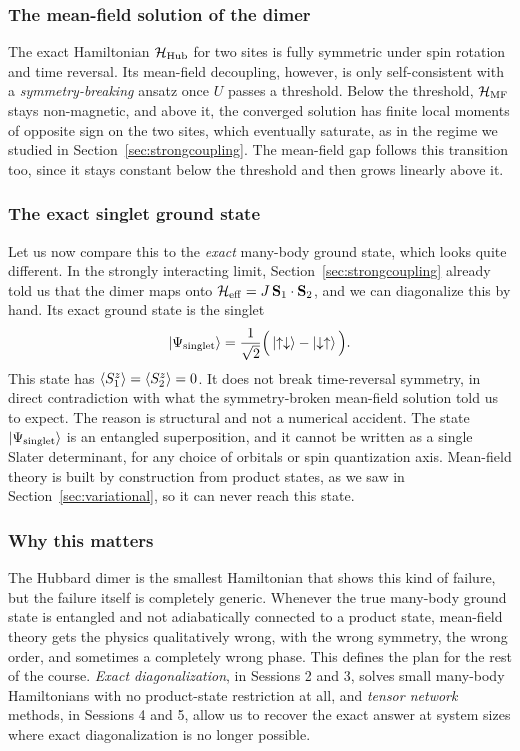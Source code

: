 \documentclass[lecture_notes.tex]{subfiles}
\begin{document}
\subsubsection{The mean-field solution of the dimer}
The exact Hamiltonian $\mathcal{H}_{\mathrm{Hub}}$ for two sites is fully symmetric under spin rotation
and time reversal. Its mean-field decoupling, however, is only self-consistent with a
\emph{symmetry-breaking} ansatz once $U$ passes a threshold. Below the threshold, $\mathcal{H}_{\mathrm{MF}}$ stays
non-magnetic, and above it, the converged solution has finite local moments of opposite sign on
the two sites, which eventually saturate, as in the regime we studied in
Section~\ref{sec:strongcoupling}. The mean-field gap follows this transition too, since it stays
constant below the threshold and then grows linearly above it.

\subsubsection{The exact singlet ground state}
Let us now compare this to the \emph{exact} many-body ground state, which looks quite different.
In the strongly interacting limit, Section~\ref{sec:strongcoupling} already told us that the
dimer maps onto $\mathcal{H}_{\mathrm{eff}} = J\,\vb S_1\cdot\vb S_2$, and we can diagonalize this by
hand. Its exact ground state is the singlet
\begin{equation}
  \ket{\Psi_{\mathrm{singlet}}} = \frac{1}{\sqrt2}\Big(\ket{\uparrow\downarrow} - \ket{\downarrow\uparrow}\Big).
\end{equation}
This state has $\expval{S_1^z} = \expval{S_2^z} = 0$. It does not break time-reversal symmetry,
in direct contradiction with what the symmetry-broken mean-field solution told us to expect. The
reason is structural and not a numerical accident. The state $\ket{\Psi_{\mathrm{singlet}}}$ is an
entangled superposition, and it cannot be written as a single Slater determinant, for any choice
of orbitals or spin quantization axis. Mean-field theory is built by construction from product
states, as we saw in Section~\ref{sec:variational}, so it can never reach this state.

\subsubsection{Why this matters}
The Hubbard dimer is the smallest Hamiltonian that shows this kind
of failure, but the failure itself is completely generic. Whenever the true many-body ground
state is entangled and not adiabatically connected to a product state, mean-field theory gets the
physics qualitatively wrong, with the wrong symmetry, the wrong order, and sometimes a completely
wrong phase. This defines the plan for the rest of the course. \emph{Exact diagonalization}, in
Sessions 2 and 3, solves small many-body Hamiltonians with no product-state restriction at all,
and \emph{tensor network} methods, in Sessions 4 and 5, allow us to recover the exact answer at
system sizes where exact diagonalization is no longer possible.
\end{document}
